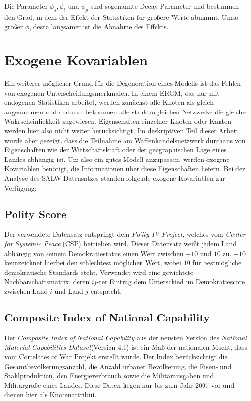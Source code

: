 \documentclass[a4paper,ngerman,oneside,titlepage,bibliography=totoc,11pt]{scrreprt}
\begin{document}
Die Parameter $\phi_s, \phi_t$ und $\phi_p$ sind sogenannte Decay-Parameter und bestimmen den Grad, in dem der Effekt der Statistiken für größere Werte abnimmt. Umso größer $\phi$, desto langsamer ist die Abnahme des Effekts.
\section{Exogene Kovariablen}
\label{sec:exkov}
Ein weiterer möglicher Grund für die Degeneration eines Modells ist das Fehlen von exogenen Unterscheidungsmerkmalen. In einem ERGM, das nur mit endogenen Statistiken arbeitet, werden zunächst alle Knoten als gleich angenommen und dadurch bekommen alle strukturgleichen Netzwerke die gleiche Wahrscheinlichkeit zugewiesen. Eigenschaften einzelner Knoten oder Kanten werden hier also nicht weiter berücksichtigt. Im deskriptiven Teil dieser Arbeit wurde aber gezeigt, dass die Teilnahme am Waffenhandelsnetzwerk durchaus von Eigenschaften wie der Wirtschaftskraft oder der geographischen Lage eines Landes abhängig ist. Um also ein gutes Modell anzupassen, werden exogene Kovariablen benötigt, die Informationen über diese Eigenschaften liefern.
Bei der Analyse des SALW Datensatzes standen folgende exogene Kovariablen zur Verfügung:

\subsection{Polity Score}
Der verwendete Datensatz entspringt dem \emph{Polity IV Project}, welches vom \emph{Center for Systemic Peace} (CSP) \citep{polity} betrieben wird. Dieser Datensatz weißt jedem Land abhängig von seinem Demokratiestatus einen Wert zwischen $-10$ und $10$ zu. $-10$ kennzeichnet hierbei den schlechtest möglichen Wert, wobei $10$ für bestmögliche demokratische Standards steht. Verwendet wird eine gewichtete Nachbarschaftsmatrix, deren $ij$-ter Eintrag dem Unterschied im Demokratiescore zwischen Land $i$ und Land $j$ entspricht.

\subsection{Composite Index of National Capability}
Der \emph{Composite Index of National Capability} aus der neusten Version des \emph{National Material Capabilities Dataset}(Version 4.1)  \citep{CINC} ist ein Maß der nationalen Macht, dass vom Correlates of War Projekt erstellt wurde. Der Index berücksichtigt die Gesamtbevölkerungsanzahl, die Anzahl urbaner Bevölkerung, die Eisen- und Stahlproduktion, den Energieverbrauch sowie die Militärausgaben und Militärgröße eines Landes. Diese Daten liegen nur bis zum Jahr 2007 vor und dienen hier als Knotenattribut.
\end{document}

